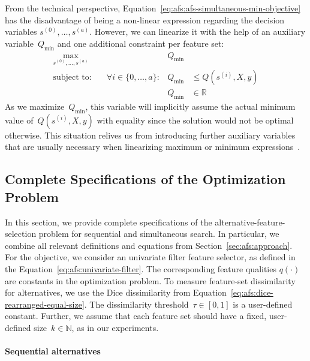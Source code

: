 \documentclass{article}
\theoremstyle{definition}
\begin{document}
From the technical perspective, Equation~\ref{eq:afs:afs-simultaneous-min-objective} has the disadvantage of being a non-linear expression regarding the decision variables $s^{(0)}, \dots, s^{(a)}$.
However, we can linearize it with the help of an auxiliary variable~$Q_{\text{min}}$ and one additional constraint per feature set:
%
\begin{equation}
	\begin{aligned}
		\max_{s^{(0)}, \dots, s^{(a)}} &\quad &Q_{\text{min}} & \\
		\text{subject to:} &\quad \forall i \in \{0, \dots, a\} : &Q_{\text{min}} &\leq Q(s^{(i)},X,y) \\
		&\quad & Q_{\text{min}} &\in \mathbb{R}
	\end{aligned}
	\label{eq:afs:afs-simultaneous-min-objective-linear}
\end{equation}
%
As we maximize~$Q_{\text{min}}$, this variable will implicitly assume the actual minimum value of~$Q(s^{(i)},X,y)$ with equality since the solution would not be optimal otherwise.
This situation relives us from introducing further auxiliary variables that are usually necessary when linearizing maximum or minimum expressions~\cite{mosek2022modeling}.

\subsection{Complete Specifications of the Optimization Problem}
\label{sec:afs:appendix:complete-optimization-problem}

In this section, we provide complete specifications of the alternative-feature-selection problem for sequential and simultaneous search.
In particular, we combine all relevant definitions and equations from Section~\ref{sec:afs:approach}.
For the objective, we consider an univariate filter feature selector, as defined in the Equation~\ref{eq:afs:univariate-filter}.
The corresponding feature qualities $q(\cdot)$ are constants in the optimization problem.
To measure feature-set dissimilarity for alternatives, we use the Dice dissimilarity from Equation~\ref{eq:afs:dice-rearranged-equal-size}.
The dissimilarity threshold~$\tau \in [0,1]$ is a user-defined constant.
Further, we assume that each feature set should have a fixed, user-defined size~$k \in \mathbb{N}$, as in our experiments.

\paragraph{Sequential alternatives}
\end{document}
